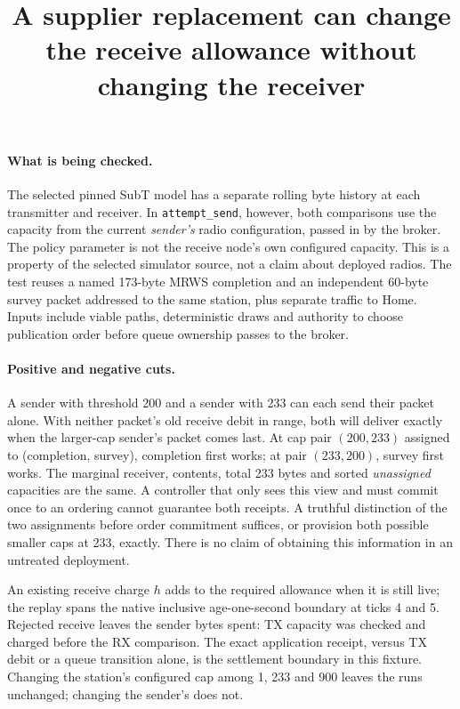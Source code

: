 \documentclass[11pt]{article}
\title{A supplier replacement can change the receive allowance without changing the receiver}
\author{}\date{}
\begin{document}
\maketitle

\paragraph{What is being checked.}
The selected pinned SubT model has a separate rolling byte history at
each transmitter and receiver. In \texttt{attempt\_send}, however, both
comparisons use the capacity from the current \emph{sender's} radio
configuration, passed in by the broker. The policy parameter is not
the receive node's own configured capacity. This is a property of the
selected simulator source, not a claim about deployed radios. The
test reuses a named 173-byte MRWS completion and an independent 60-byte
survey packet addressed to the same station, plus separate traffic
to Home. Inputs include viable paths, deterministic draws and authority
to choose publication order before queue ownership passes to the broker.

\paragraph{Positive and negative cuts.}
A sender with threshold 200 and a sender with 233 can each send their
packet alone. With neither packet's old receive debit in range, both will
deliver exactly when the larger-cap sender's packet comes last. At cap
pair \((200,233)\) assigned to (completion, survey), completion first
works; at pair \((233,200)\), survey first works. The marginal receiver,
contents, total 233 bytes and sorted \emph{unassigned} capacities
are the same. A controller that only sees this view and must commit
once to an ordering cannot guarantee both receipts. A truthful
distinction of the two assignments before order commitment suffices,
or provision both possible smaller caps at 233, exactly. There is no
claim of obtaining this information in an untreated deployment.

An existing receive charge \(h\) adds to the required allowance when
it is still live; the replay spans the native inclusive age-one-second
boundary at ticks 4 and 5. Rejected receive leaves the sender bytes spent:
TX capacity was checked and charged before the RX comparison. The exact
application receipt, versus TX debit or a queue transition alone, is
the settlement boundary in this fixture. Changing the station's
configured cap among 1, 233 and 900 leaves the runs unchanged; changing
the sender's does not.
\end{document}
